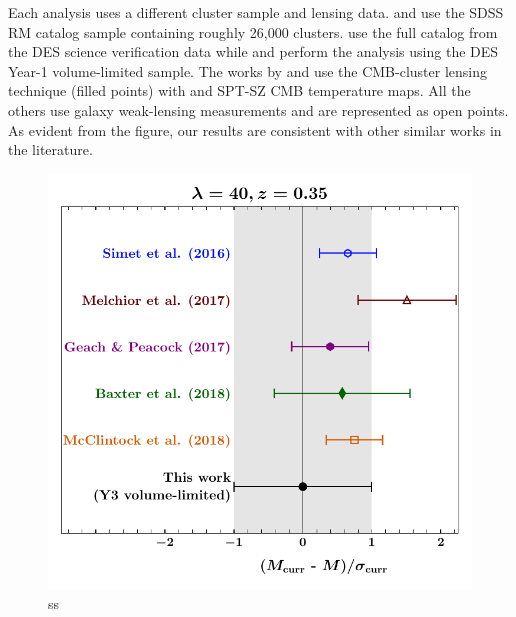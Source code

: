 Each analysis uses a different cluster sample and lensing data.
\citet{simet18} and \citet{geach17} use the SDSS RM catalog sample containing roughly 26,000 clusters. %
\citet{melchoir17} use the full catalog from the DES science verification data while  and  perform the analysis using the DES Year-1 volume-limited sample.
The works by \citet{geach17} and  use the CMB-cluster lensing technique (filled points) with \planck{} and {\sc SPT-SZ} CMB temperature maps.
All the others use galaxy weak-lensing measurements and are represented as open points. As evident from the figure, our results are consistent with other similar works in the literature.

\begin{figure}
\centering
\includegraphics{figs/lit_comparisons_JODY.pdf}
\caption{ss}
\label{fig_lit_comparison}
\end{figure}